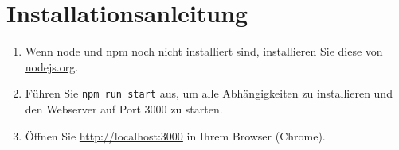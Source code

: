 \section{Installationsanleitung}

\begin{enumerate}
  \item Wenn node und npm noch nicht installiert sind, installieren Sie diese von \href{https://nodejs.org/en/}{nodejs.org}.
  \item Führen Sie \texttt{npm run start} aus, um alle Abhängigkeiten zu installieren und den Webserver auf Port 3000 zu starten.
  \item Öffnen Sie \href{http://localhost:3000}{http://localhost:3000} in Ihrem Browser (Chrome).
\end{enumerate}